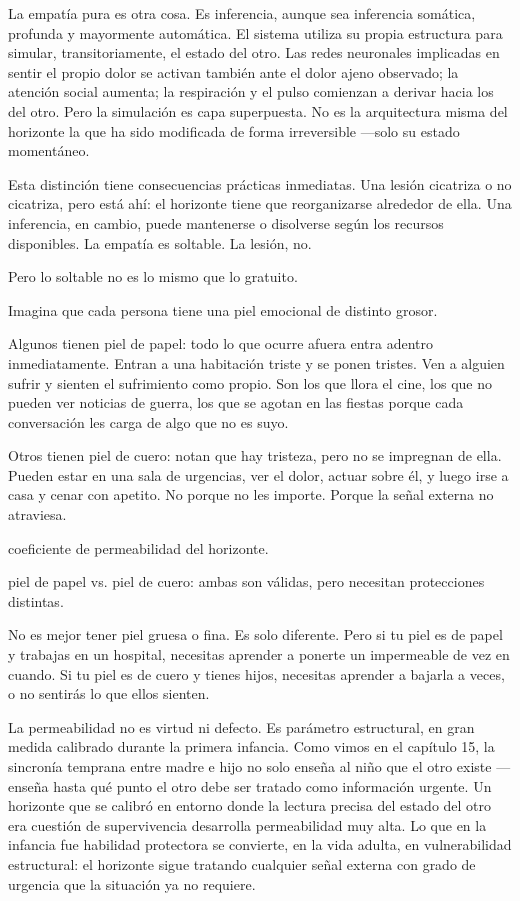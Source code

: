 La empatía pura es otra cosa. Es inferencia, aunque sea inferencia somática, profunda y mayormente automática. El sistema utiliza su propia estructura para simular, transitoriamente, el estado del otro. Las redes neuronales implicadas en sentir el propio dolor se activan también ante el dolor ajeno observado; la atención social aumenta; la respiración y el pulso comienzan a derivar hacia los del otro. Pero la simulación es capa superpuesta. No es la arquitectura misma del horizonte la que ha sido modificada de forma irreversible —solo su estado momentáneo.

Esta distinción tiene consecuencias prácticas inmediatas. Una lesión cicatriza o no cicatriza, pero está ahí: el horizonte tiene que reorganizarse alrededor de ella. Una inferencia, en cambio, puede mantenerse o disolverse según los recursos disponibles. La empatía es soltable. La lesión, no.

Pero lo soltable no es lo mismo que lo gratuito.

\noindent Imagina que cada persona tiene una piel emocional de distinto grosor.

Algunos tienen piel de papel: todo lo que ocurre afuera entra adentro inmediatamente. Entran a una habitación triste y se ponen tristes. Ven a alguien sufrir y sienten el sufrimiento como propio. Son los que llora el cine, los que no pueden ver noticias de guerra, los que se agotan en las fiestas porque cada conversación les carga de algo que no es suyo.

Otros tienen piel de cuero: notan que hay tristeza, pero no se impregnan de ella. Pueden estar en una sala de urgencias, ver el dolor, actuar sobre él, y luego irse a casa y cenar con apetito. No porque no les importe. Porque la señal externa no atraviesa.

\begin{fisica}
 coeficiente de permeabilidad del horizonte.

 piel de papel vs. piel de cuero: ambas son válidas, pero necesitan protecciones distintas.
\end{fisica}
No es mejor tener piel gruesa o fina. Es solo diferente. Pero si tu piel es de papel y trabajas en un hospital, necesitas aprender a ponerte un impermeable de vez en cuando. Si tu piel es de cuero y tienes hijos, necesitas aprender a bajarla a veces, o no sentirás lo que ellos sienten.

La permeabilidad no es virtud ni defecto. Es parámetro estructural, en gran medida calibrado durante la primera infancia. Como vimos en el capítulo 15, la sincronía temprana entre madre e hijo no solo enseña al niño que el otro existe —enseña hasta qué punto el otro debe ser tratado como información urgente. Un horizonte que se calibró en entorno donde la lectura precisa del estado del otro era cuestión de supervivencia desarrolla permeabilidad muy alta. Lo que en la infancia fue habilidad protectora se convierte, en la vida adulta, en vulnerabilidad estructural: el horizonte sigue tratando cualquier señal externa con grado de urgencia que la situación ya no requiere.

